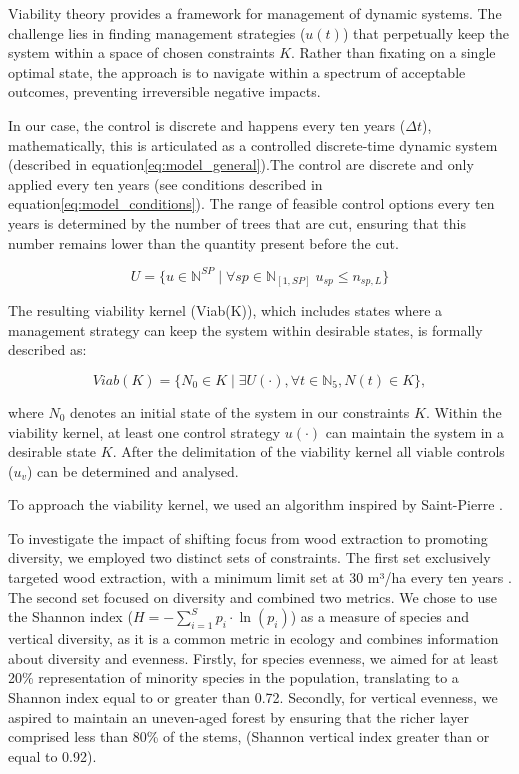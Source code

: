 \documentclass{article}
\begin{document}
Viability theory provides a framework for management of dynamic systems. The challenge lies in finding management strategies (\(u(t)\)) that perpetually keep the system within a space of chosen constraints $K$. Rather than fixating on a single optimal state, the approach is to navigate within a spectrum of acceptable outcomes, preventing irreversible negative impacts.

In our case, the control is discrete and happens every ten years ($\Delta t$), mathematically, this is articulated as a controlled discrete-time dynamic system (described in equation\eqref{eq:model_general}).The control are discrete and only applied every ten years (see conditions described in equation\eqref{eq:model_conditions}). The range of feasible control options every ten years is determined by the number of trees that are cut, ensuring that this number remains lower than the quantity present before the cut.

\begin{equation}
     U = \{u \in \mathbb{N}^{SP} \mid \forall sp \in \mathbb{N}_{[1,SP]} \; u_{sp} \leq n_{sp,L}\}
\end{equation}

The resulting viability kernel (Viab(K)), which includes states where a management strategy can keep the system within desirable states, is formally described as:

\begin{equation}
    Viab(K) = \{N_0 \in K \mid\exists U(\cdot), \forall t \in \mathbb{N}_5, N(t) \in K\},
\end{equation}

where \(N_0\) denotes an initial state of the system in our constraints $K$. Within the viability kernel, at least one control strategy $u(\cdot)$ can maintain the system in a desirable state $K$. After the delimitation of the viability kernel all viable controls (\(u_v\)) can be determined and analysed.

To approach the viability kernel, we used an algorithm inspired by Saint-Pierre \autocite{saint-pierreApproximationViabilityKernel1994}.

To investigate the impact of shifting focus from wood extraction to promoting diversity, we employed two distinct sets of constraints. The first set exclusively targeted wood extraction, with a minimum limit set at 30 m³/ha every ten years \autocite{IGN}. The second set focused on diversity and combined two metrics. We chose to use the Shannon index ($H = -\sum_{i=1}^{S} p_i \cdot \ln(p_i)$) as a measure of species and vertical diversity, as it is a common metric in ecology and combines information about diversity and evenness. Firstly, for species evenness, we aimed for at least 20\% representation of minority species in the population, translating to a Shannon index equal to or greater than 0.72. Secondly, for vertical evenness, we aspired to maintain an uneven-aged forest by ensuring that the richer layer comprised less than 80\% of the stems, (Shannon vertical index greater than or equal to 0.92).
\\
\end{document}
